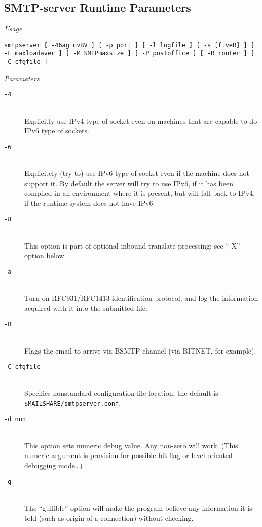 \subsection{SMTP-server Runtime Parameters}

{\em Usage}

{\tt smtpserver [ -46aginvBV ] [ -p port ] [ -l logfile ] [ -s [ftveR] ] [ -L maxloadaver ] [ -M SMTPmaxsize ] [ -P postoffice ] [ -R router ] [ -C cfgfile ]}

{\em Parameters}

\begin{description}
\item[\tt -4] \mbox{} \\
Explicitly use IPv4 type of socket even on machines that are capable to do
IPv6 type of sockets.

\item[\tt -6] \mbox{} \\
Explicitely (try to) use IPv6 type of socket even if the machine does not
support it.
By default the server will try to use IPv6, if it has been compiled in
an environment where it is present, but will fall back to IPv4, if
the runtime system does not have IPv6.

\item[\tt -8] \mbox{} \\
This option is part of optional inbound translate processing;
see ``-X'' option below.

\item[\tt -a] \mbox{} \\
Turn on RFC931/RFC1413 identification protocol, and log the information
acquired with it into the submitted file.

\item[\tt -B] \mbox{} \\
Flags the email to arrive via BSMTP channel (via BITNET, for example).

\item[\tt -C cfgfile] \mbox{} \\
Specifies nonstandard configuration file location; the default is 
{\tt \$MAILSHARE/smtpserver.conf}.

\item[\tt -d nnn] \mbox{} \\
This option sets numeric debug value.  Any non-zero will work.
(This numeric argument is provision for possible bit-flag or
level oriented debugging mode\ldots)

\item[{\tt -g}] \mbox{} \\
The ``gullible'' option will make the program believe any information
it is told (such as origin of a connection) without checking.


\end{description}
